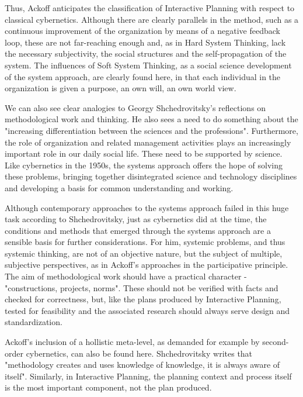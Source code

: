 \documentclass[a4paper,12pt]{scrartcl}
\begin{document}
Thus, Ackoff anticipates the classification of Interactive Planning with respect to classical cybernetics. Although there are clearly parallels in the method, such as a continuous improvement of the organization by means of a negative feedback loop, these are not far-reaching enough and, as in Hard System Thinking, lack the necessary subjectivity, the social structures and the self-propagation of the system.
The influences of Soft System Thinking, as a social science development of the system approach, are clearly found here, in that each individual in the organization is given a purpose, an own will, an own world view.

We can also see clear analogies to Georgy Shchedrovitsky's reflections on methodological work and thinking. He also sees a need to do something about the "increasing differentiation between the sciences and the professions".\cite{shchedrovitsky:1981} Furthermore, the role of organization and related management activities plays an increasingly important role in our daily social life. These need to be supported by science. Like cybernetics in the 1950s, the systems approach offers the hope of solving these problems, bringing together disintegrated science and technology disciplines and developing a basis for common understanding and working. 

Although contemporary approaches to the systems approach failed in this huge task according to Shchedrovitsky, just as cybernetics did at the time, the conditions and methods that emerged through the systems approach are a sensible basis for further considerations. For him, systemic problems, and thus systemic thinking, are not of an objective nature, but the subject of multiple, subjective perspectives, as in Ackoff's approaches in the participative principle. The aim of methodological work should have a practical character - "constructions, projects, norms". These should not be verified with facts and checked for correctness, but, like the plans produced by Interactive Planning, tested for feasibility and the associated research should always serve design and standardization.\cite{shchedrovitsky:1981}

Ackoff's inclusion of a hollistic meta-level, as demanded for example by second-order cybernetics, can also be found here. Shchedrovitsky writes that "methodology creates and uses knowledge of knowledge, it is always aware of itself".\cite{shchedrovitsky:1981} Similarly, in  Interactive Planning, the planning context and process itself is the most important component, not the plan produced.\cite{wilbon:2012}
\end{document}
